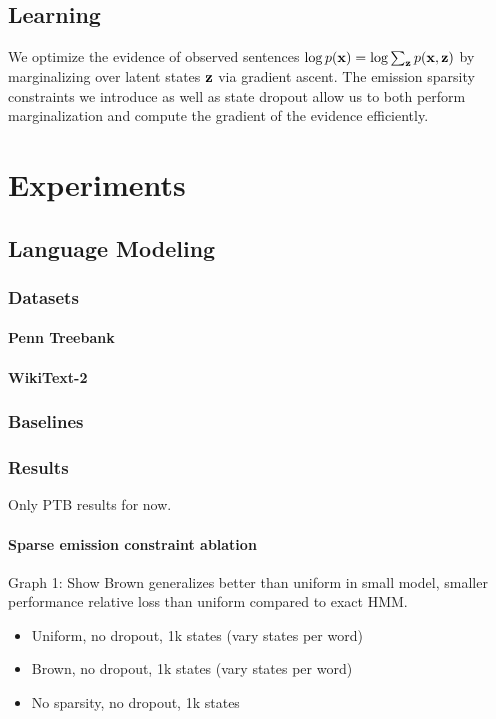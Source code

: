 \documentclass[11pt,a4paper]{article}
\begin{document}
\subsection{Learning}
We optimize the evidence of observed sentences $\log p(\mathbf{x}) = \log \sum_{\mathbf{z}} p(\mathbf{x},\mathbf{z})$
by marginalizing over latent states $\mathbf{z}$ via gradient ascent.
The emission sparsity constraints we introduce as well as state dropout
allow us to both perform marginalization
and compute the gradient of the evidence efficiently.

\section{Experiments}
\subsection{Language Modeling}
\subsubsection{Datasets}
\paragraph{Penn Treebank}
\paragraph{WikiText-2}
\subsubsection{Baselines}

\subsubsection{Results}
Only PTB results for now.
\paragraph{Sparse emission constraint ablation}
Graph 1: Show Brown generalizes better than uniform in small model,
smaller performance relative loss than uniform compared to exact HMM.
\begin{itemize}
\item Uniform, no dropout, 1k states (vary states per word)
\item Brown, no dropout, 1k states (vary states per word)
\item No sparsity, no dropout, 1k states
\end{itemize}
\end{document}
